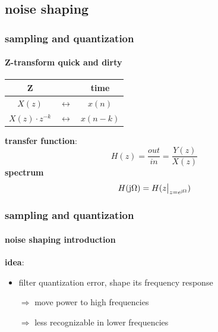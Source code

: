         \subsection{noise shaping}

	\begin{frame}\frametitle{sampling and quantization}\framesubtitle{Z-transform quick and dirty}
		\begin{table}
			\centering
					\begin{tabular}{ccc}
					\hline
					\textbf{Z} &  & \textbf{time}\\
					\hline 
					$X(z)$ &$\leftrightarrow$& $x(n)$\\
					$X(z)\cdot z^{-k}$ &$\leftrightarrow$& $x(n-k)$\\
					\end{tabular}
		\end{table}
		\pause
		\textbf{transfer function}:
		\begin{equation}
			H(z) = \frac{out}{in} = \frac{Y(z)}{X(z)}
		\end{equation}
		\pause
		\textbf{spectrum}
		\begin{equation}
			H(\mathrm{j}\Omega) = H(z\big|_{z=e^{\mathrm{j}\Omega}})
		\end{equation}
	\end{frame}
	
	\begin{frame}\frametitle{sampling and quantization}\framesubtitle{noise shaping introduction}
		\textbf{idea}:
		\begin{itemize}
			\item	filter quantization error, shape its frequency response
			\pause
            \bigskip
			\item[$\Rightarrow$]	move power to high frequencies
			\item[$\Rightarrow$]	less recognizable in lower frequencies
		\end{itemize}
	\end{frame}
	
